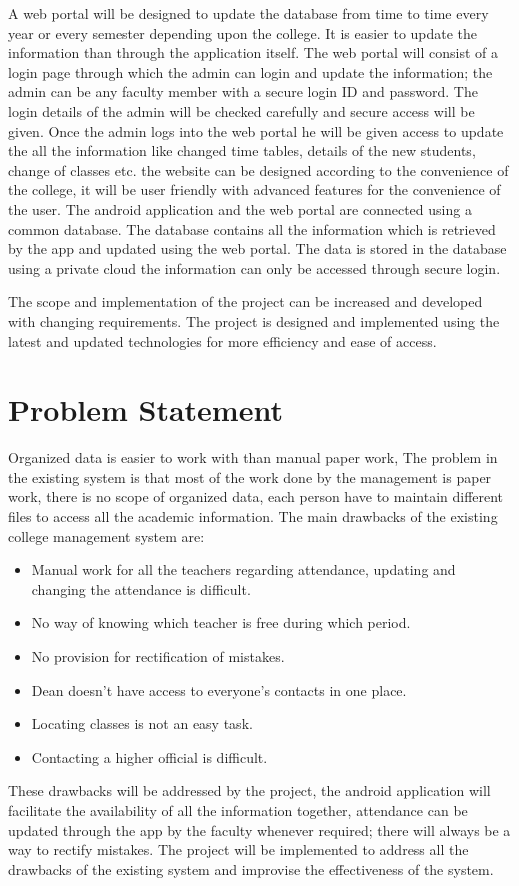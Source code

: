 \documentclass[BTech]{srmuthesis}
\begin{document}
A web portal will be designed to update the database from time to time every year or every semester depending upon the college. It is easier to update the information than through the application itself. The web portal will consist of a login page through which the admin can login and update the information; the admin can be any faculty member with a secure login ID and password. The login details of the admin will be checked carefully and secure access will be given. Once the admin logs into the web portal he will be given access to update the all the information like changed time tables, details of the new students, change of classes etc. the website can be designed according to the convenience of the college, it will be user friendly with advanced features for the convenience of the user. The android application and the web portal are connected using a common database. The database contains all the information which is retrieved by the app and updated using the web portal. The data is stored in the database using a private cloud the information can only be accessed through secure login.

The scope and implementation of the project can be increased and developed with changing requirements. The project is designed and implemented using the latest and updated technologies for more efficiency and ease of access.
\section{Problem Statement}
Organized data is easier to work with than manual paper work, The problem in the existing system is that most of the work done by the management is paper work, there is no scope of organized data, each person have to maintain different files to access all the academic information. The main drawbacks of the existing college management system are:
\begin{itemize}
\item Manual work for all the teachers regarding attendance, updating and changing the attendance is difficult.
\item No way of knowing which teacher is free during which period.
\item No provision for rectification of mistakes.
\item Dean doesn't have access to everyone's contacts in one place.
\item Locating classes is not an easy task.
\item Contacting a higher official is difficult.
\end{itemize}
These drawbacks will be addressed by the project, the android application will facilitate the availability of all the information together, attendance can be updated through the app by the faculty whenever required; there will always be a way to rectify mistakes. The project will be implemented to address all the drawbacks of the existing system and improvise the effectiveness of the system.
\end{document}
